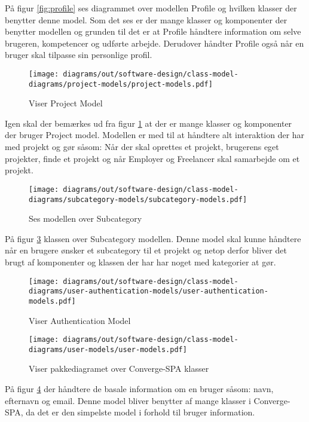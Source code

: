På figur \ref{fig:profile} ses diagrammet over modellen Profile og hvilken klasser der benytter denne model. Som det ses er der mange klasser og komponenter der benytter modellen og grunden til det er at Profile håndtere information om selve brugeren, kompetencer og udførte arbejde. Derudover håndter Profile også når en bruger skal tilpasse sin personlige profil.

\begin{figure}[H]
    \centering
\texttt{[image: diagrams/out/software-design/class-model-diagrams/project-models/project-models.pdf]}
\caption{Viser Project Model}
\label{fig:project}
\end{figure}

Igen skal der bemærkes ud fra figur \ref{fig:project} at der er mange klasser og komponenter der bruger Project model. Modellen er med til at håndtere alt interaktion der har med projekt og gør såsom: Når der skal oprettes et projekt, brugerens eget projekter, finde et projekt og når Employer og Freelancer skal samarbejde om et projekt.

\begin{figure}[H]
    \centering
\texttt{[image: diagrams/out/software-design/class-model-diagrams/subcategory-models/subcategory-models.pdf]}
\caption{Ses modellen over Subcategory}
\label{fig:subcategory}
\end{figure}

På figur \ref{fig:subcategory} klassen over Subcategory modellen. Denne model skal kunne håndtere når en brugere ønsker et subcategory til et projekt og netop derfor bliver det brugt af komponenter og klassen der har har noget med kategorier at gør.  

\begin{figure}[H]
    \centering
\texttt{[image: diagrams/out/software-design/class-model-diagrams/user-authentication-models/user-authentication-models.pdf]}
\caption{Viser Authentication Model}
\label{fig:subcategory}
\end{figure}


\begin{figure}[H]
    \centering
\texttt{[image: diagrams/out/software-design/class-model-diagrams/user-models/user-models.pdf]}
\caption{Viser pakkediagramet over Converge-SPA klasser}
\label{fig:user}
\end{figure}

På figur \ref{fig:user} der håndtere de basale information om en bruger såsom: navn, efternavn og email. Denne model bliver benytter af mange klasser i Converge-SPA, da det er den simpelste model i forhold til bruger information.